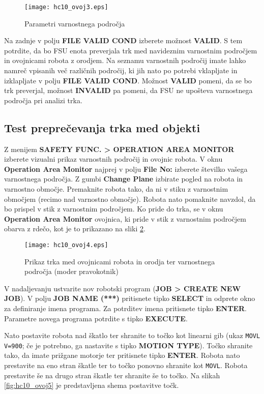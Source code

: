 \begin{figure}[!hbt]
	\centering
	\texttt{[image: hc10\_ovoj3.eps]}
	\caption{Parametri varnostnega področja}
	\label{fig:hc10_ovoj3}
\end{figure}

Na zadnje v polju \textbf{FILE VALID COND} izberete možnost \textbf{VALID}. S tem potrdite, da bo FSU enota preverjala trk med navideznim varnostnim področjem in ovojnicami robota z orodjem. Na seznamu varnostnih področij imate lahko namreč vpisanih več različnih področij, ki jih nato po potrebi vklapljate in izklapljate  v polju \textbf{FILE VALID COND}. Možnost \textbf{VALID} pomeni, da se bo trk preverjal, možnost \textbf{INVALID} pa pomeni, da FSU ne upošteva varnostnega področja pri analizi trka.

\subsection*{Test preprečevanja trka med objekti}

Z menijem \textbf{SAFETY FUNC. > OPERATION AREA MONITOR} izberete vizualni prikaz varnostnih področij in ovojnic robota. V oknu \textbf{Operation Area Monitor} najprej v polju \textbf{File No:} izberete številko vašega varnostnega področja. Z gumbi \textbf{Change Plane} izbirate pogled na robota in  varnostno območje. Premaknite robota tako, da ni v stiku z varnostnim območjem (recimo nad varnostno območje). Robota nato pomaknite navzdol, da bo prispel v stik z varnostnim področjem. Ko pride do trka, se v oknu \textbf{Operation Area Monitor} ovojnica, ki pride v stik z varnostnim področjem obarva z rdečo, kot je to prikazano na sliki \ref{fig:hc10_ovoj4}.

\begin{figure}[!hbt]
	\centering
	\texttt{[image: hc10\_ovoj4.eps]}
	\caption{Prikaz trka med ovojnicami robota in orodja ter varnostnega področja (moder pravokotnik)}
	\label{fig:hc10_ovoj4}
\end{figure}

V nadaljevanju ustvarite nov robotski program (\textbf{JOB > CREATE NEW JOB}). V polju \textbf{JOB NAME (***)} pritisnete tipko \textbf{SELECT} in odprete okno za
definiranje imena programa. Za potrditev imena pritisnete tipko \textbf{ENTER}. Parametre novega programa potrdite s tipko \textbf{EXECUTE}.

Nato postavite robota nad škatlo ter shranite to točko kot linearni gib (ukaz \verb"MOVL V=900"; če je potrebno, ga nastavite s tipko \textbf{MOTION TYPE}). Točko shranite tako, da imate prižgane motorje ter pritisnete tipko \textbf{ENTER}. Robota nato prestavite na eno stran škatle ter to točko ponovno shranite kot \verb"MOVL". Robota prestavite še na drugo stran škatle ter shranite še to točko. Na slikah \ref{fig:hc10_ovoj5} je predstavljena shema postavitve točk.


